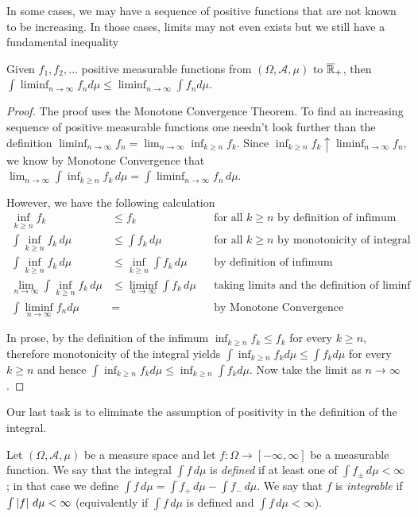  In some cases, we may have a sequence of positive functions that are not known
to be increasing.  In those cases, limits may not even exists but we
still have a fundamental inequality
\begin{thm}\label{Fatou}Given $f_1, f_2, \dots$
  positive measurable functions from
  $(\Omega, \mathcal{A}, \mu)$ to $\overline{\mathbb{R}}_+$,
  then $\int \liminf_{n \to \infty} f_n d \mu \leq \liminf_{n \to
    \infty} \int f_n d \mu$.
\end{thm}
\begin{proof}The proof uses the Monotone Convergence Theorem.  To find
  an increasing sequence of positive measurable functions one needn't
  look further than the definition $\liminf_{n \to \infty} f_n =
  \lim_{n \to \infty} \inf_{k \geq n} f_k$.  Since $\inf_{k \geq n}
  f_k \uparrow \liminf_{n \to \infty} f_n$, we know by Monotone
  Convergence that $\lim_{n \to \infty} \int \inf_{k \geq n}
  f_k \, d \mu = \int \liminf_{n \to \infty} f_n \, d \mu$.  

However, we have the following calculation
\begin{align*}
\inf_{k \geq n} f_k &\leq f_k  & &\textrm{for all $k\geq n$ by
  definition of infimum} \\
\int \inf_{k \geq n} f_k \, d\mu &\leq \int f_k \,
d \mu & &\textrm{for all $k\geq n$ by
  monotonicity of integral} \\
\int \inf_{k \geq n} f_k \, d\mu &\leq \inf_{k \geq n} \int f_k \,
d \mu & &\textrm{by
  definition of infimum} \\
\lim_{n \to \infty} \int
\inf_{k \geq n} f_k \, d\mu &\leq \liminf_{n \to \infty} \int f_k \,
d \mu & &\textrm{taking limits and the
  definition of $\liminf$} \\
\int \liminf_{n \to \infty} f_n d \mu &= & & \textrm{by Monotone Convergence}
\end{align*}

In prose, by the  definition of the infimum $\inf_{k \geq n} f_k \leq f_k$ for every
  $k \geq n$, therefore monotonicity of the integral yields $\int
  \inf_{k \geq n} f_k d \mu \leq \int f_k d \mu$ for every
  $k \geq n$ and hence $\int
  \inf_{k \geq n} f_k d \mu \leq \inf_{k\geq n} \int f_k d \mu$.  Now
  take the limit as $n \to \infty$.
\end{proof}

Our last task is to eliminate the assumption of positivity in the
definition of the integral.  
\begin{defn}Let $(\Omega,
  \mathcal{A}, \mu)$ be a measure space and let $f : \Omega \to [-\infty, \infty]$ be a measurable function.  We say that the integral
$\int f \, d\mu$ is \emph{defined} if at least one of $\int f_\pm \, d\mu < \infty$; in that case we define  $\int f \, d \mu = \int
  f_+ \, d\mu - \int f_{-} \, d \mu$.  We say that $f$ is \emph{integrable} if $\int \left \vert f \right \vert \, d\mu <
  \infty$ (equivalently if $\int f \, d\mu$ is defined and $\int f \, d\mu < \infty$).  
\end{defn}

